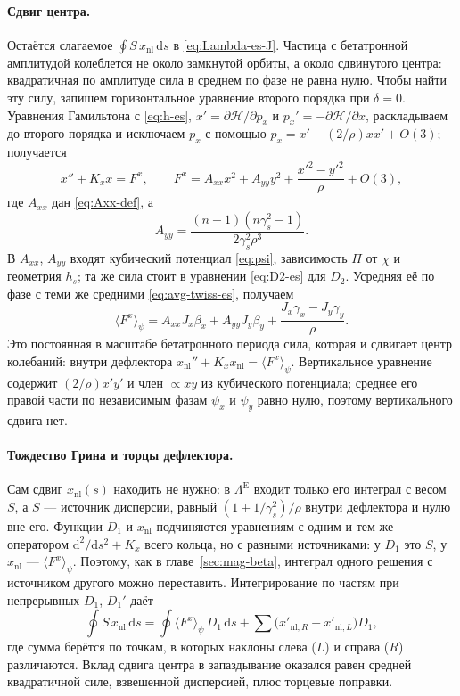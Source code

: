 \paragraph{Сдвиг центра.}
Остаётся слагаемое $\oint S\,x_{\mathrm{nl}}\,\mathrm{d}s$ в \eqref{eq:Lambda-es-J}. Частица с бетатронной амплитудой колеблется не около замкнутой орбиты, а около сдвинутого центра: квадратичная по амплитуде сила в среднем по фазе не равна нулю. Чтобы найти эту силу, запишем горизонтальное уравнение второго порядка при $\delta=0$. Уравнения Гамильтона с \eqref{eq:h-es}, $x'=\partial\mathcal{H}/\partial p_x$ и $p_x'=-\partial\mathcal{H}/\partial x$, раскладываем до второго порядка и исключаем $p_x$ с помощью $p_x=x'-(2/\rho)xx'+O(3)$; получается
\begin{equation}
\label{eq:Fx-es}
x''+K_x x=F^x,
\qquad
F^x=A_{xx}x^2+A_{yy}y^2+\frac{x'^2-y'^2}{\rho}+O(3),
\end{equation}
где $A_{xx}$ дан \eqref{eq:Axx-def}, а
\begin{equation}
\label{eq:Axx-es}
A_{yy}=\frac{(n-1)(n\gamma_s^2-1)}{2\gamma_s^2\rho^3}.
\end{equation}
В $A_{xx}$, $A_{yy}$ входят кубический потенциал \eqref{eq:psi}, зависимость $\Pi$ от $\chi$ и геометрия $h_s$; та же сила стоит в уравнении \eqref{eq:D2-es} для $D_2$. Усредняя её по фазе с теми же средними \eqref{eq:avg-twiss-es}, получаем
\begin{equation}
\label{eq:Favg-es}
\langle F^x\rangle_\psi
=A_{xx}J_x\beta_x+A_{yy}J_y\beta_y
+\frac{J_x\gamma_x-J_y\gamma_y}{\rho}.
\end{equation}
Это постоянная в масштабе бетатронного периода сила, которая и сдвигает центр колебаний: внутри дефлектора $x_{\mathrm{nl}}''+K_xx_{\mathrm{nl}}=\langle F^x\rangle_\psi$. Вертикальное уравнение содержит $(2/\rho)x'y'$ и член $\propto xy$ из кубического потенциала; среднее его правой части по независимым фазам $\psi_x$ и $\psi_y$ равно нулю, поэтому вертикального сдвига нет.

\paragraph{Тождество Грина и торцы дефлектора.}
Сам сдвиг $x_{\mathrm{nl}}(s)$ находить не нужно: в $\Lambda^{\mathrm{E}}$ входит только его интеграл с весом $S$, а $S$ --- источник дисперсии, равный $(1+1/\gamma_s^2)/\rho$ внутри дефлектора и нулю вне его. Функции $D_1$ и $x_{\mathrm{nl}}$ подчиняются уравнениям с одним и тем же оператором $\mathrm{d}^2/\mathrm{d}s^2+K_x$ всего кольца, но с разными источниками: у $D_1$ это $S$, у $x_{\mathrm{nl}}$ --- $\langle F^x\rangle_\psi$. Поэтому, как в главе~\ref{sec:mag-beta}, интеграл одного решения с источником другого можно переставить. Интегрирование по частям при непрерывных $D_1$, $D_1'$ даёт
\begin{equation}
\label{eq:xnl-es}
\oint S\,x_{\mathrm{nl}}\,\mathrm{d}s
=\oint\langle F^x\rangle_\psi\,D_1\,\mathrm{d}s
+\sum\bigl(x'_{\mathrm{nl},R}-x'_{\mathrm{nl},L}\bigr)D_1,
\end{equation}
где сумма берётся по точкам, в которых наклоны слева ($L$) и справа ($R$) различаются. Вклад сдвига центра в запаздывание оказался равен средней квадратичной силе, взвешенной дисперсией, плюс торцевые поправки.

